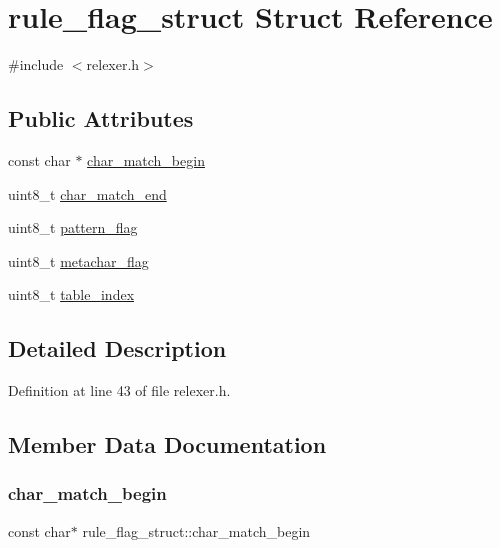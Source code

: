 \hypertarget{structrule__flag__struct}{}\section{rule\+\_\+flag\+\_\+struct Struct Reference}
\label{structrule__flag__struct}


{\ttfamily \#include $<$relexer.\+h$>$}

\subsection*{Public Attributes}
\begin{DoxyCompactItemize}
\item 
const char $\ast$ \hyperlink{structrule__flag__struct_ad7c23cb8598d6dee994bf35fa99d12a0}{char\+\_\+match\+\_\+begin}
\item 
uint8\+\_\+t \hyperlink{structrule__flag__struct_a274a201cd01397f7f076be900ac98f49}{char\+\_\+match\+\_\+end}
\item 
uint8\+\_\+t \hyperlink{structrule__flag__struct_a7d788995133759b08c435b1f6824d4b9}{pattern\+\_\+flag}
\item 
uint8\+\_\+t \hyperlink{structrule__flag__struct_a85b403ba71a3211be5dd01679e392ad2}{metachar\+\_\+flag}
\item 
uint8\+\_\+t \hyperlink{structrule__flag__struct_aaae98036c87ad1ac6c46ceef4ad07a1f}{table\+\_\+index}
\end{DoxyCompactItemize}


\subsection{Detailed Description}


Definition at line 43 of file relexer.\+h.



\subsection{Member Data Documentation}
\mbox{\label{structrule__flag__struct_ad7c23cb8598d6dee994bf35fa99d12a0}} 
\subsubsection{\texorpdfstring{char\+\_\+match\+\_\+begin}{char\_match\_begin}}
{\footnotesize\ttfamily const char$\ast$ rule\+\_\+flag\+\_\+struct\+::char\+\_\+match\+\_\+begin}




